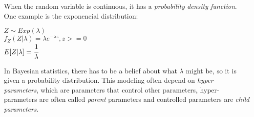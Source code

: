 \documentclass{article}
\begin{document}
When the random variable is continuous, it has a \textit{probability density function}. One example is the exponencial distribution:\\

\begin{center}
	$Z \sim Exp(\lambda)$\\
	\vspace{0.2cm}
	$f_{Z}(Z|\lambda) = \lambda e^{-\lambda z}, z >= 0$\\
	\vspace{0.2cm}
	$E[Z|\lambda] = \cfrac{1}{\lambda}$
\end{center}

In Bayesian statistics, there has to be a belief about what $\lambda$ might be, so it is given a probability distribution. This modeling often depend on \textit{hyper-parameters}, which are parameters that control other parameters, hyper-parameters are often called \textit{parent} parameters and controlled parameters are \textit{child parameters}.



\end{document}
